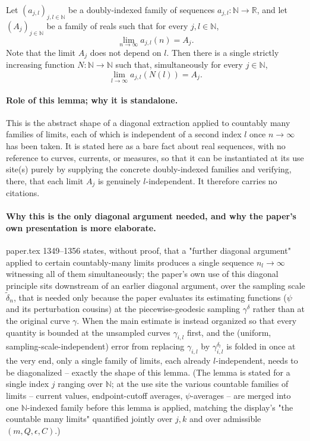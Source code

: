 \begin{lemma}
  Let $(a_{j,l})_{j,l\in\mathbb{N}}$ be a doubly-indexed family of sequences $a_{j,l}\colon
  \mathbb{N}\to\mathbb{R}$, and let $(A_j)_{j\in\mathbb{N}}$ be a family of reals such that for
  every $j,l\in\mathbb{N}$,
  \[
    \lim_{n\to\infty} a_{j,l}(n) = A_j
    .
  \]
  Note that the limit $A_j$ does not depend on $l$. Then there is a single strictly increasing
  function $N\colon\mathbb{N}\to\mathbb{N}$ such that, simultaneously for every $j\in\mathbb{N}$,
  \[
    \lim_{l\to\infty} a_{j,l}(N(l)) = A_j
    .
  \]

  \paragraph{Role of this lemma; why it is standalone.} This is the abstract shape of a diagonal
  extraction applied to countably many families of limits, each of which is independent of a
  second index $l$ once $n\to\infty$ has been taken. It is stated here as a bare fact about real
  sequences, with no reference to curves, currents, or measures, so that it can be instantiated at
  its use site(s) purely by supplying the concrete doubly-indexed families and verifying, there,
  that each limit $A_j$ is genuinely $l$-independent. It therefore carries no \noderef{} citations.

  \paragraph{Why this is the only diagonal argument needed, and why the paper's own presentation
  is more elaborate.} paper.tex 1349--1356 states, without proof, that a "further diagonal
  argument" applied to certain countably-many limits produces a single sequence $n_l\to\infty$
  witnessing all of them simultaneously; the paper's own use of this diagonal principle sits
  downstream of an earlier diagonal argument, over the sampling scale $\tilde\delta_n$, that is
  needed only because the paper evaluates its estimating functions ($\psi$ and its perturbation
  cousins) at the piecewise-geodesic sampling $\gamma^\delta$ rather than at the original curve
  $\gamma$. When the main estimate is instead organized so that every quantity is bounded at the
  unsampled curves $\gamma_{i,l}$ first, and the (uniform, sampling-scale-independent) error from
  replacing $\gamma_{i,l}$ by $\gamma^{\delta_l}_{i,l}$ is folded in once at the very end, only a
  single family of limits, each already $l$-independent, needs to be diagonalized -- exactly the
  shape of this lemma. (The lemma is stated for a single index $j$ ranging over $\mathbb{N}$; at
  the use site the various countable families of limits -- current values, endpoint-cutoff
  averages, $\psi$-averages -- are merged into one $\mathbb{N}$-indexed family before this lemma is
  applied, matching the display's "the countable many limits" quantified jointly over $j,k$ and
  over admissible $(m,Q,\epsilon,C)$.)
\end{lemma}
